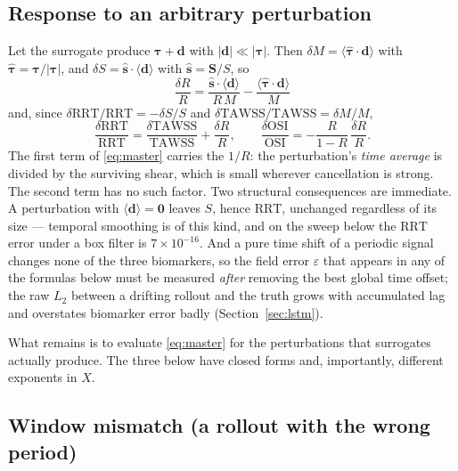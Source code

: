 \documentclass[11pt,a4paper]{article}
\newcommand{\TAWSS}{\mathrm{TAWSS}}
\newcommand{\OSI}{\mathrm{OSI}}
\newcommand{\RRT}{\mathrm{RRT}}
\newcommand{\eps}{\varepsilon}
\begin{document}
\subsection{Response to an arbitrary perturbation}

Let the surrogate produce $\boldsymbol\tau+\mathbf d$ with
$|\mathbf d|\ll|\boldsymbol\tau|$. Then
$\delta M=\langle\hat{\boldsymbol\tau}\cdot\mathbf d\rangle$ with
$\hat{\boldsymbol\tau}=\boldsymbol\tau/|\boldsymbol\tau|$, and
$\delta S=\hat{\mathbf s}\cdot\langle\mathbf d\rangle$ with
$\hat{\mathbf s}=\mathbf S/S$, so
\begin{equation}
\boxed{\;\frac{\delta R}{R}
=\frac{\hat{\mathbf s}\cdot\langle\mathbf d\rangle}{R\,M}
-\frac{\langle\hat{\boldsymbol\tau}\cdot\mathbf d\rangle}{M}\;}
\label{eq:master}
\end{equation}
and, since $\delta\RRT/\RRT=-\delta S/S$ and
$\delta\TAWSS/\TAWSS=\delta M/M$,
\begin{equation}
\frac{\delta\RRT}{\RRT}=\frac{\delta\TAWSS}{\TAWSS}+\frac{\delta R}{R},
\qquad
\frac{\delta\OSI}{\OSI}=-\frac{R}{1-R}\,\frac{\delta R}{R}.
\label{eq:chain}
\end{equation}
The first term of \eqref{eq:master} carries the $1/R$: the perturbation's
\emph{time average} is divided by the surviving shear, which is small
wherever cancellation is strong. The second term has no such factor. Two
structural consequences are immediate. A perturbation with
$\langle\mathbf d\rangle=\mathbf 0$ leaves $S$, hence $\RRT$, unchanged
regardless of its size --- temporal smoothing is of this kind, and on the
sweep below the $\RRT$ error under a box filter is $7\times10^{-16}$. And a
pure time shift of a periodic signal changes none of the three biomarkers, so
the field error $\eps$ that appears in any of the formulas below must be
measured \emph{after} removing the best global time offset; the raw $L_2$
between a drifting rollout and the truth grows with accumulated lag and
overstates biomarker error badly (Section~\ref{sec:lstm}).

What remains is to evaluate \eqref{eq:master} for the perturbations that
surrogates actually produce. The three below have closed forms and,
importantly, different exponents in $X$.

\subsection{Window mismatch (a rollout with the wrong period)}
\label{sec:window}
\end{document}
